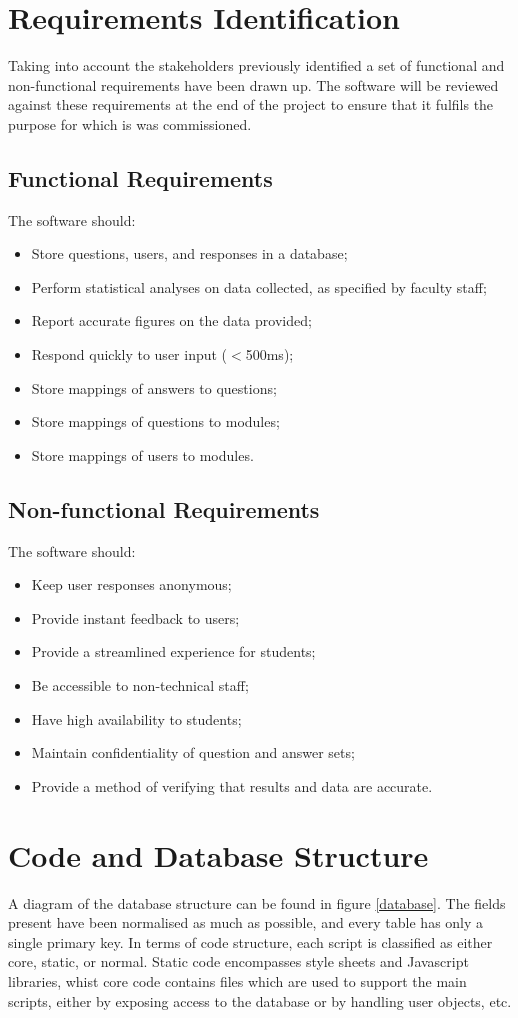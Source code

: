 \documentclass[12pt,a4paper,twoside]{report}
\begin{document}
\section{Requirements Identification}
Taking into account the stakeholders previously identified a set of functional and non-functional requirements have been drawn up. The software will be reviewed against these requirements at the end of the project to ensure that it fulfils the purpose for which is was commissioned.

\subsection{Functional Requirements}
The software should:
\begin{itemize}
	\item Store questions, users, and responses in a database;
	\item Perform statistical analyses on data collected, as specified by faculty staff;
	\item Report accurate figures on the data provided;
	\item Respond quickly to user input ($<$500ms);
	\item Store mappings of answers to questions;
	\item Store mappings of questions to modules;
	\item Store mappings of users to modules.
\end{itemize}
\subsection{Non-functional Requirements}
The software should:
\begin{itemize}
	\item Keep user responses anonymous;
	\item Provide instant feedback to users;
	\item Provide a streamlined experience for students;
	\item Be accessible to non-technical staff;
	\item Have high availability to students;
	\item Maintain confidentiality of question and answer sets;
	\item Provide a method of verifying that results and data are accurate.
\end{itemize}

\section{Code and Database Structure}
A diagram of the database structure can be found in figure \ref{database}. The fields present have been normalised as much as possible, and every table has only a single primary key. In terms of code structure, each script is classified as either core, static, or normal. Static code encompasses style sheets and Javascript libraries, whist core code contains files which are used to support the main scripts, either by exposing access to the database or by handling user objects, etc. 
\end{document}
